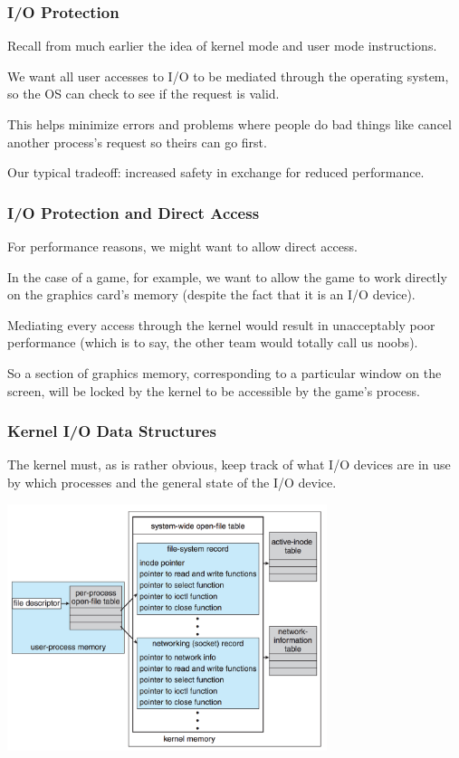 \begin{frame}
\frametitle{I/O Protection}

Recall from much earlier the idea of kernel mode and user mode instructions. 

We want all user accesses to I/O to be mediated through the operating system, so the OS can check to see if the request is valid. 

This helps minimize errors and problems where people do bad things like cancel another process's request so theirs can go first. 

Our typical tradeoff: increased safety in exchange for reduced performance.



\end{frame}

\begin{frame}
\frametitle{I/O Protection and Direct Access}

For performance reasons, we might want to allow direct access. 

In the case of a game, for example, we want to allow the game to work directly on the graphics card's memory (despite the fact that it is an I/O device). 

Mediating every access through the kernel would result in unacceptably poor performance (which is to say, the other team would totally call us noobs). 

So a section of graphics memory, corresponding to a particular window on the screen, will be locked by the kernel to be accessible by the game's process.


\end{frame}

\begin{frame}
\frametitle{Kernel I/O Data Structures}
The kernel must, as is rather obvious, keep track of what I/O devices are in use by which processes and the general state of the I/O device.

\begin{center}
	\includegraphics[width=0.7\textwidth]{images/unix-io-kernel.png}
\end{center}


\end{frame}

